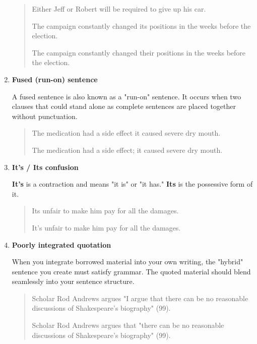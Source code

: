 \begin{enumerate}
\begin{quote}
Either Jeff or Robert will be required to give up his car. 
\medskip

The campaign constantly changed its positions in the weeks before the election. 

The campaign constantly changed their positions in the weeks before the election. 
\end{quote}

\item \textbf{Fused (run-on) sentence}

A fused sentence is also known as a "run-on" sentence. It occurs when two
clauses that could stand alone as complete sentences are placed together
without punctuation.

 \begin{quote}
The medication had a side effect it caused severe dry mouth. 

The medication had a side effect; it caused severe dry mouth. 
\end{quote}

\item \textbf{It's / Its confusion}

\textbf{It's} is a contraction and means "it is" or "it has." \textbf{Its} is the
possessive form of it.

\begin{quote}
Its unfair to make him pay for all the damages. 

It's unfair to make him pay for all the damages. 

\end{quote}

\item \textbf{Poorly integrated quotation}

When you integrate borrowed material into your own writing, the 
"hybrid" sentence you create must satisfy grammar. The quoted material should
blend seamlessly into your sentence structure.

\begin{quote}
Scholar Rod Andrews argues "I argue that there can be no 
reasonable discussions of Shakespeare's biography" (99). 

Scholar Rod Andrews argues that "there can be no reasonable discussions 
of Shakespeare's biography" (99). 
\end{quote}


\end{enumerate}

